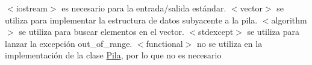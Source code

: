$<$iostream$>$ es necesario para la entrada/salida estándar. $<$vector$>$ se utiliza para implementar la estructura de datos subyacente a la pila. $<$algorithm$>$ se utiliza para buscar elementos en el vector. $<$stdexcept$>$ se utiliza para lanzar la excepción out\+\_\+of\+\_\+range. $<$functional$>$ no se utiliza en la implementación de la clase \mbox{\hyperlink{class_pila}{Pila}}, por lo que no es necesario 